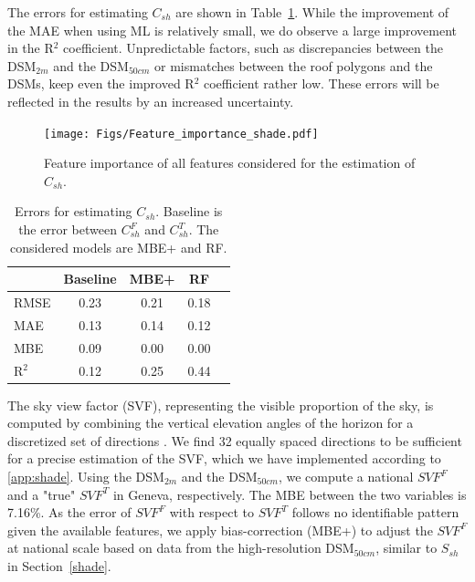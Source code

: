 The errors for estimating $C_{sh}$ are shown in Table~\ref{tab:errors_Csh}. While the improvement of the MAE when using ML is relatively small, we do observe a large improvement in the R$^2$ coefficient.
Unpredictable factors, such as discrepancies between the DSM$_{2m}$ and the DSM$_{50cm}$ or mismatches between the roof polygons and the DSMs, keep even the improved R$^2$ coefficient rather low. 
These errors will be reflected in the results by an increased uncertainty.

\begin{figure}[tb]
\centering
\texttt{[image: Figs/Feature\_importance\_shade.pdf]}  
\caption{Feature importance of all features considered for the estimation of $C_{sh}$.}
\label{fig:RF_Csh}
\end{figure}

\begin{table}[tb]
\centering
\footnotesize
\caption{Errors for estimating $C_{sh}$. Baseline is the error between $C_{sh}^F$ and $C_{sh}^T$. The considered models are MBE+ and RF.}
\label{tab:errors_Csh}
\begin{tabular}{lcccc}
\hline
      & \textbf{Baseline} & \textbf{MBE+} & \textbf{RF}   \\ \hline
RMSE  & 0.23     & 0.21  & 0.18 \\
MAE   & 0.13     & 0.14  & 0.12 \\
MBE   & 0.09     & 0.00  & 0.00 \\
R$^2$ & 0.12     & 0.25  & 0.44 \\ \hline
\end{tabular}
\end{table}

The sky view factor (SVF), representing the visible proportion of the sky, is computed by combining the vertical elevation angles of the horizon for a discretized set of directions \cite{zaksek_sky-view_2011}. We find 32 equally spaced directions to be sufficient for a precise estimation of the SVF, which we have implemented according to \ref{app:shade}.
Using the DSM$_{2m}$ and the DSM$_{50cm}$, we compute a national $SVF^F$ and a "true" $SVF^T$ in Geneva, respectively. The MBE between the two variables is 7.16\%.  
As the error of $SVF^F$ with respect to $SVF^T$ follows no identifiable pattern given the available features, we apply bias-correction (MBE+) to adjust the $SVF^F$ at national scale based on data from the high-resolution DSM$_{50cm}$, similar to $S_{sh}$ in Section~\ref{shade}.


